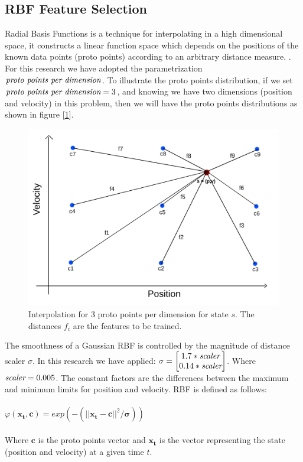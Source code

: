 \documentclass[10pt,twocolumn]{article}
\begin{document}
\subsection{RBF Feature Selection}
Radial Basis Functions is a technique for interpolating in a high dimensional space, it constructs a linear function space which depends on
the positions of the known data points (proto points) according to an arbitrary distance measure. \cite{Radial}. For this research we have adopted the parametrization
$\emph{proto points per dimension}$. To illustrate the proto points distribution, if we set $\emph{proto points per dimension} = 3$, and knowing we have two dimensions
(position and velocity) in this problem, then we will have the proto points distributions as shown in figure [\ref{rbf-figure}].
\begin{figure}[h]
  \begin{center}
      \includegraphics[scale=0.2]{rbf.png}
  \end{center}
  \caption{Interpolation for 3 proto points per dimension for state $s$. The distances $f_{i}$ are the features to be trained.}
  \label{rbf-figure}
\end{figure}
The smoothness of a Gaussian RBF is controlled by the magnitude of distance scaler $\sigma$. In this research we have applied:
$\mathbf{\sigma} = \begin{bmatrix} 1.7 * \emph{scaler} \\ 0.14 * \emph{scaler} \end{bmatrix}$. Where $\emph{scaler} = 0.005$. 
The constant factors are the differences between the maximum and minimum limits for position and velocity. RBF is defined as follows:
\\ \\
$\varphi(\mathbf{x_{t}}, \mathbf{c}) = exp(-(|| \mathbf{x_{t}} - \mathbf{c} ||^2 / \mathbf{\sigma}))$
\\ \\
Where $\mathbf{c}$ is the proto points vector and $\mathbf{x_{t}}$ is the vector representing the state (position and velocity) at a given time $t$.
\end{document}
